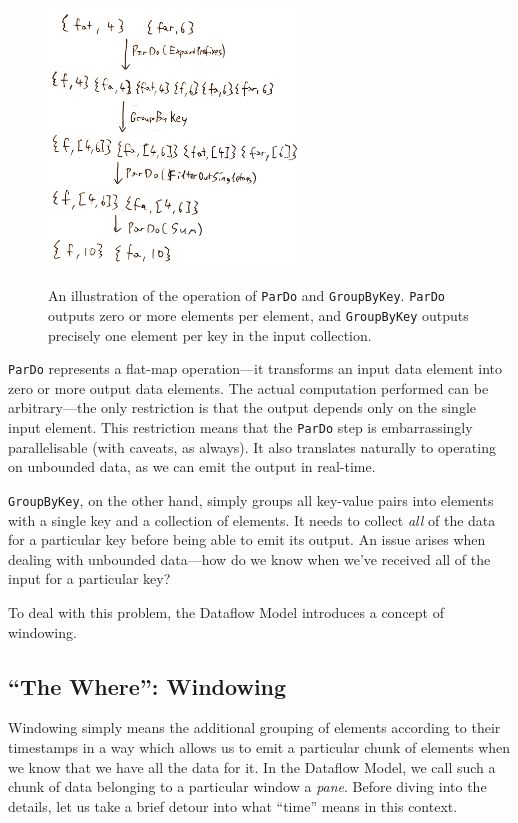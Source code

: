 \begin{figure}[h]
	\centering
	\includegraphics[width=0.6\textwidth]{images/temp/pardo-gbk}
	\label{fig:prep:pardo-gbk}
	\caption{An illustration of the operation of \texttt{ParDo} and \texttt{GroupByKey}. \texttt{ParDo} outputs zero or more elements per element, and \texttt{GroupByKey} outputs precisely one element per key in the input collection.}
\end{figure}


\verb|ParDo| represents a flat-map operation---it transforms an input data element into zero or more output data elements.
The actual computation performed can be arbitrary---the only restriction is that the output depends only on the single input element.
This restriction means that the \verb|ParDo| step is embarrassingly parallelisable (with caveats, as always).
It also translates naturally to operating on unbounded data, as we can emit the output in real-time.

\verb|GroupByKey|, on the other hand, simply groups all key-value pairs into elements with a single key and a collection of elements.
It needs to collect \emph{all} of the data for a particular key before being able to emit its output.
An issue arises when dealing with unbounded data---how do we know when we've received all of the input for a particular key?

To deal with this problem, the Dataflow Model introduces a concept of windowing.

\subsection{``The Where'': Windowing}\label{sec:prep:dataflow:where}

Windowing simply means the additional grouping of elements according to their timestamps in a way which allows us to emit a particular chunk of elements when we know that we have all the data for it.
In the Dataflow Model, we call such a chunk of data belonging to a particular window a \emph{pane}.
Before diving into the details, let us take a brief detour into what ``time'' means in this context.

